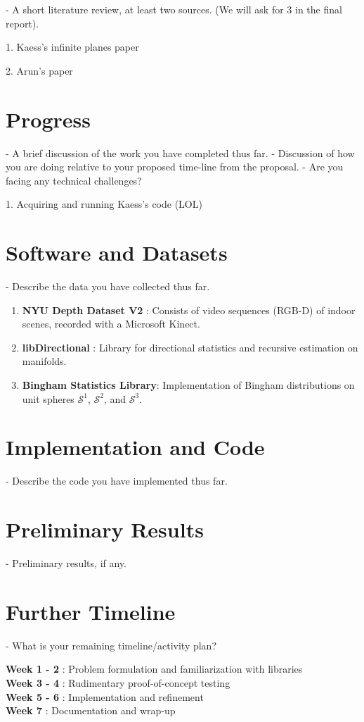 \documentclass[12pt]{article}
\begin{document}
- A short literature review, at least two sources. (We will ask for 3 in the final report).

1. Kaess's infinite planes paper

2. Arun's paper 

\section{Progress}

- A brief discussion of the work you have completed thus far.
- Discussion of how you are doing relative to your proposed time-line from the proposal.
- Are you facing any technical challenges?

1. Acquiring and running Kaess's code (LOL)
\section{Software and Datasets}

- Describe the data you have collected thus far. 
\begin{enumerate}
\item \textbf{NYU Depth Dataset V2} \cite{NYU}: Consists of video sequences (RGB-D) of indoor scenes, recorded with a Microsoft Kinect. 
\item \textbf{libDirectional} \cite{libdirectional}: Library for directional statistics and recursive estimation on manifolds. 
\item \textbf{Bingham Statistics Library}:  Implementation of Bingham distributions on unit spheres $\mathcal{S}^1$, $\mathcal{S}^2$, and $\mathcal{S}^3$. 
\end{enumerate}

\section{Implementation and Code}
- Describe the code you have implemented thus far.


\section{Preliminary Results}
- Preliminary results, if any.

\section{Further Timeline}
- What is your remaining timeline/activity plan?

\textbf{Week 1 - 2} : Problem formulation and familiarization with libraries \\ 
\textbf{Week 3 - 4} : Rudimentary proof-of-concept testing \\
\textbf{Week 5 - 6} : Implementation and refinement \\
\textbf{Week 7} : Documentation and wrap-up \\
\end{document}
